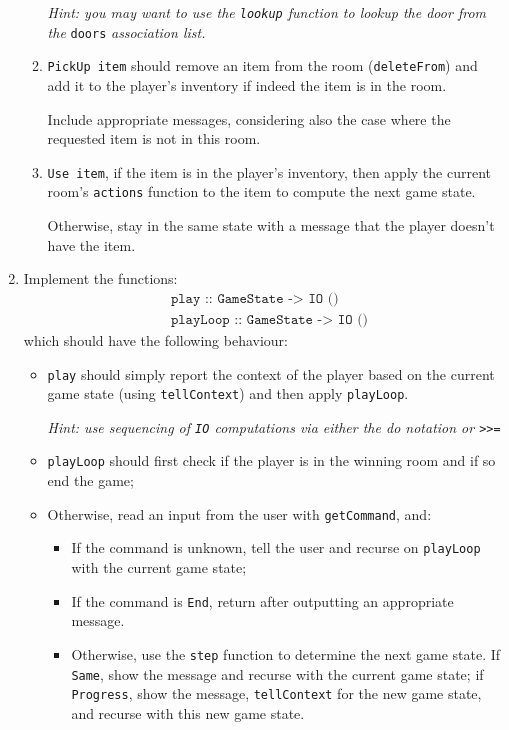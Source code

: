 \documentclass{article}
\newcommand{\topMarks}[1]{\marginnote{(#1 marks)}}
\begin{document}
\begin{enumerate}[leftmargin=1.4em]
\begin{enumerate}
\emph{Hint: you may want to use the \texttt{lookup} function to
lookup the door from the} \texttt{doors} \emph{association list.}

\item \texttt{PickUp item} should
remove an item from the room (\texttt{deleteFrom}) and add it to the player's
inventory if indeed the item is in the room.

Include appropriate messages, considering also the case where
the requested item is not in this room.

\item \texttt{Use item}, if the item
is in the player's inventory, then
apply the current room's \texttt{actions} function
to the item to compute the next game state.

Otherwise, stay in the same state with a message
that the player doesn't have the item.
\end{enumerate}

\item \topMarks{12} Implement the functions:
%
\begin{align*}
& \texttt{play :: GameState -> IO ()} \\
& \texttt{playLoop :: GameState -> IO ()}
\end{align*}
%
which should have the following behaviour:
%
\begin{itemize}
\item \texttt{play} should simply report the context of the player based on the current game state
  (using \texttt{tellContext}) and then apply \texttt{playLoop}.

\emph{Hint: use sequencing of \texttt{IO} computations via either
the \emph{do} notation or \texttt{>>=}}
%
\item \texttt{playLoop} should first check if the player is in the winning room
  and if so end the game;
\item Otherwise, read an input from the user with \texttt{getCommand}, and:
 \begin{itemize}[leftmargin=1em]
   \item If the command is unknown, tell the user and recurse on
     \texttt{playLoop} with the current game state;
   \item If the command is \texttt{End}, return after outputting an
     appropriate message.
   \item Otherwise, use the \texttt{step} function to determine
     the next game state. If \texttt{Same}, show the
     message and recurse with the current game state; if
     \texttt{Progress}, show the message, \texttt{tellContext} for the
     new game state, and recurse with this new game state.
\end{itemize}
\end{itemize}


\end{enumerate}
\end{document}
